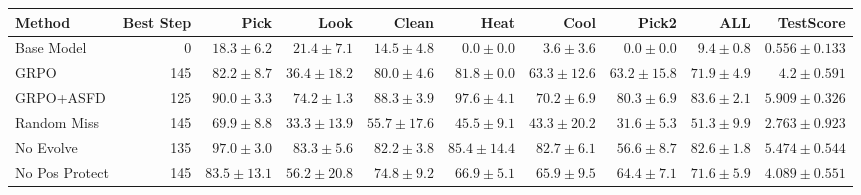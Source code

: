 \begin{tabular}{lrrrrrrrrr}
\toprule
Method & Best Step & Pick & Look & Clean & Heat & Cool & Pick2 & ALL & TestScore \\
\midrule
Base Model & 0 & $18.3 \pm 6.2$ & $21.4 \pm 7.1$ & $14.5 \pm 4.8$ & $0.0 \pm 0.0$ & $3.6 \pm 3.6$ & $0.0 \pm 0.0$ & $9.4 \pm 0.8$ & $0.556 \pm 0.133$ \\
GRPO & 145 & $82.2 \pm 8.7$ & $36.4 \pm 18.2$ & $80.0 \pm 4.6$ & $81.8 \pm 0.0$ & $63.3 \pm 12.6$ & $63.2 \pm 15.8$ & $71.9 \pm 4.9$ & $4.2 \pm 0.591$ \\
GRPO+ASFD & 125 & $90.0 \pm 3.3$ & $74.2 \pm 1.3$ & $88.3 \pm 3.9$ & $97.6 \pm 4.1$ & $70.2 \pm 6.9$ & $80.3 \pm 6.9$ & $83.6 \pm 2.1$ & $5.909 \pm 0.326$ \\
Random Miss & 145 & $69.9 \pm 8.8$ & $33.3 \pm 13.9$ & $55.7 \pm 17.6$ & $45.5 \pm 9.1$ & $43.3 \pm 20.2$ & $31.6 \pm 5.3$ & $51.3 \pm 9.9$ & $2.763 \pm 0.923$ \\
No Evolve & 135 & $97.0 \pm 3.0$ & $83.3 \pm 5.6$ & $82.2 \pm 3.8$ & $85.4 \pm 14.4$ & $82.7 \pm 6.1$ & $56.6 \pm 8.7$ & $82.6 \pm 1.8$ & $5.474 \pm 0.544$ \\
No Pos Protect & 145 & $83.5 \pm 13.1$ & $56.2 \pm 20.8$ & $74.8 \pm 9.2$ & $66.9 \pm 5.1$ & $65.9 \pm 9.5$ & $64.4 \pm 7.1$ & $71.6 \pm 5.9$ & $4.089 \pm 0.551$ \\
\bottomrule
\end{tabular}
